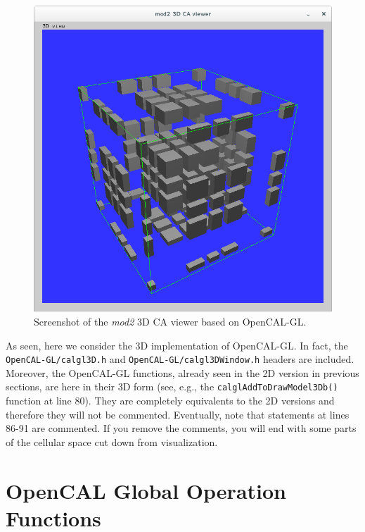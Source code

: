 

\begin{figure}
  \begin{center}
    \includegraphics[width=12cm]{./images/OpenCAL/calgl_mod2}
    \caption{Screenshot of the \emph{mod2} 3D CA viewer based on
      OpenCAL-GL.}
    \label{fig:calgl_mod2}
  \end{center}
\end{figure}

As seen, here we consider the 3D implementation of
OpenCAL-GL. In fact, the \verb'OpenCAL-GL/calgl3D.h' and
\verb'OpenCAL-GL/calgl3DWindow.h' headers are included. Moreover, the
OpenCAL-GL functions, already seen in the 2D version in previous
sections, are here in their 3D form (see, e.g., the
\verb'calglAddToDrawModel3Db()' function at line 80). They are
completely equivalents to the 2D versions and therefore they will not
be commented. Eventually, note that statements at lines 86-91 are
commented. If you remove the comments, you will end with some parts of
the cellular space cut down from visualization.


\section{OpenCAL Global Operation Functions}\label{sec:redution}

